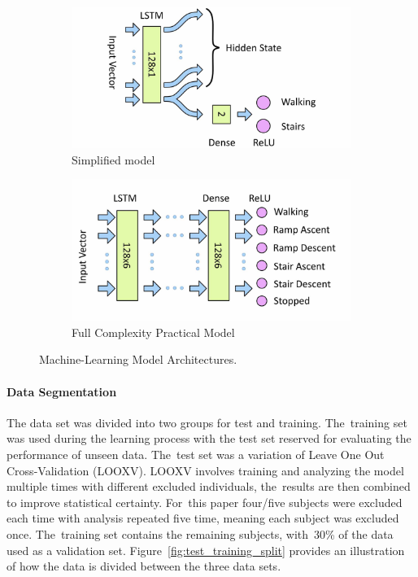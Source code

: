 \begin{figure}[!hbt]
    \centering
        \begin{subfigure}[H]{0.49\textwidth}
    \centering
        \includegraphics[width=\textwidth]{content/4-LSTM_Behaviour/lstm/Simplified_Network.jpg}
        \caption{Simplified model}
        \label{subfig:simplfied_lstm_model}
    \end{subfigure}
       \vspace{3pt}
    \hfill
    \begin{subfigure}[H]{0.49\textwidth}
    \centering
        \includegraphics[width=\textwidth]{content/4-LSTM_Behaviour/lstm/LSTM_Network.jpg}
        \caption{Full Complexity Practical Model}
        \label{subfig:full_lstm_model}
    \end{subfigure}
    \vspace{3pt}
    \caption{Machine-Learning Model Architectures.}
    \label{fig:ml_models}
\end{figure}

\paragraph{Data Segmentation}
The data set was divided into two groups for test and training. The~training set was used during the learning process with the test set reserved for evaluating the performance of unseen data. The~test set was a variation of Leave One Out Cross-Validation (LOOXV). LOOXV involves training and analyzing the model multiple times with different excluded individuals, the~results are then combined to improve statistical certainty. For~this paper four/five subjects were excluded each time with analysis repeated five time, meaning each subject was excluded once. The~training set contains the remaining subjects, with~30\% of the data used as a validation set. Figure~\ref{fig:test_training_split} provides an illustration of how the data is divided between the three data sets.

